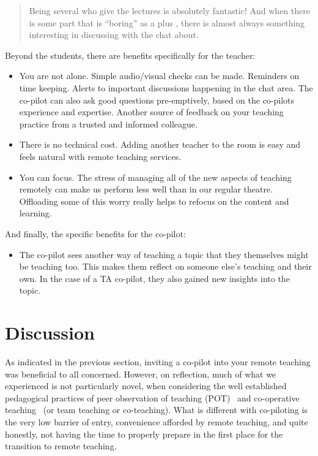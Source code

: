 \documentclass[sigconf,natbib=false]{acmart}
\begin{document}
\begin{quote}
Being several who give the lectures is absolutely fantastic! And when there is some part that is \enquote{boring} as a plus , there is almost always something interesting in discussing with the chat about.
\end{quote}

\noindent
Beyond the students, there are benefits specifically for the teacher:

\begin{itemize}
  \item You are not alone. Simple audio/visual checks can be made. Reminders on time keeping. Alerts to important discussions happening in the chat area. The co-pilot can also ask good questions pre-emptively, based on the co-pilots experience and expertise. Another source of feedback on your teaching practice from a trusted and informed colleague.

  \item There is no technical cost. Adding another teacher to the room is easy and feels natural with remote teaching services.

  \item You can focus. The stress of managing all of the new aspects of teaching remotely can make us perform less well than in our regular theatre. Offloading some of this worry really helps to refocus on the content and learning.
\end{itemize}

\noindent
And finally, the specific benefits for the co-pilot:

\begin{itemize}
  \item The co-pilot sees another way of teaching a topic that they themselves might be teaching too. This makes them reflect on someone else's teaching and their own. In the case of a TA co-pilot, they also gained new insights into the topic.
\end{itemize}

\section{Discussion}

As indicated in the previous section, inviting a co-pilot into your remote teaching was beneficial to all concerned. However, on reflection, much of what we experienced is not particularly novel, when considering the well established pedagogical practices of peer observation of teaching (POT)~\cite{PeerObservation} and co-operative teaching~\cite{bauwens1995cooperative} (or team teaching or co-teaching). What is different with co-piloting is the very low barrier of entry, convenience afforded by remote teaching, and quite honestly, not having the time to properly prepare in the first place for the transition to remote teaching.
\end{document}
